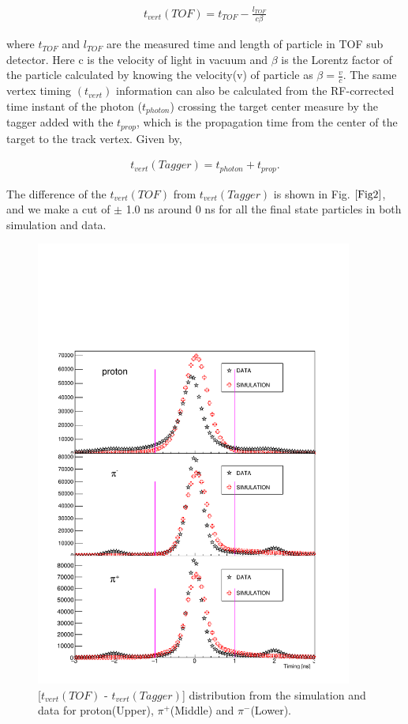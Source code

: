 \documentclass[12pt,a4paper]{amsbook}
\theoremstyle{definition}
\begin{document}
\begin{eqnarray*}
t_{vert}(TOF) = t_{TOF}  -  \frac{l_{TOF}}{c\beta}
\end{eqnarray*}

where $t_{TOF}$ and $l_{TOF}$ are the measured time and length of particle in TOF sub detector. Here c is the velocity of light in vacuum and $\beta$ is the Lorentz factor of the particle calculated by knowing the velocity(v) of particle as $\beta = \frac{v}{c}$. The same vertex timing $(t_{vert})$ information can also be calculated from the RF-corrected time instant of the photon ($t_{photon}$)  crossing the target center measure by the tagger added with the $t_{prop}$, which is the propagation time from the center of the target to the track vertex. Given by,

\begin{eqnarray*}
t_{vert}(Tagger) = t_{photon} + t_{prop}.
\end{eqnarray*}


The difference of the $t_{vert}(TOF)$ from $t_{vert}(Tagger)$ is shown in Fig.$~\ref{Fig2}$, and we make a cut of $\pm$ 1.0 ns around 0 ns for all the final state particles in both simulation and data. 
\begin{figure}[ht!]
\centerline{
\includegraphics[height=5.8in]{timing.pdf}}
\caption{[$t_{vert}(TOF)$ - $t_{vert}(Tagger)$] distribution from the simulation and data for proton(Upper), $\pi^{+}$(Middle) and $\pi^{-}$(Lower).}
\label{Fig2}
\end{figure}
\end{document}
